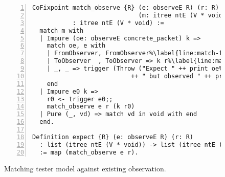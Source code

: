 \begin{figure}
\begin{lstlisting}[numbers=left]
CoFixpoint match_observe {R} (e: observeE R) (r: R)
                             (m: itree ntE (V * void))
           : itree ntE (V * void) :=
  match m with
  | Impure (oe: observeE concrete_packet) k =>
    match oe, e with
    | FromObserver, FromObserver%\label{line:match-from}%
    | ToObserver  , ToObserver => k r%\label{line:match-to}%
    | _, _ => trigger (Throw ("Expect " ++ print oe%\label{line:match-throw}%
                           ++ " but observed " ++ print e))
    end
  | Impure e0 k =>
    r0 <- trigger e0;;
    match_observe e r (k r0)
  | Pure (_, vd) => match vd in void with end
  end.

Definition expect {R} (e: observeE R) (r: R)
  : list (itree ntE (V * void)) -> list (itree ntE (V * void))
  := map (match_observe e r).
\end{lstlisting}
\vspace*{1em}
\caption{Matching tester model against existing observation.}
\label{fig:match-observe}
\end{figure}

